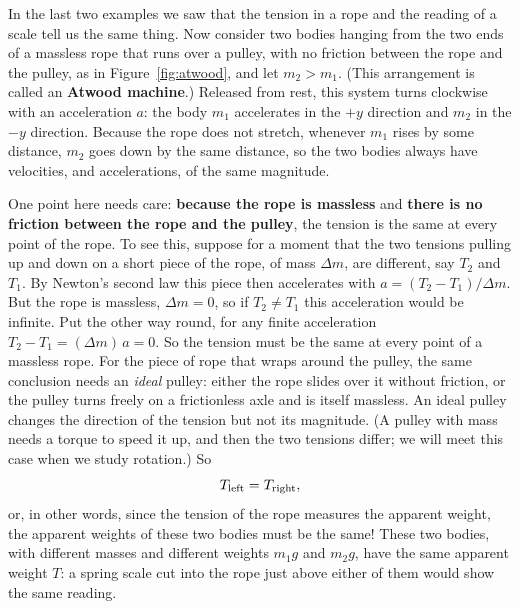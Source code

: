 \documentclass[11pt,a4paper]{article}
\begin{document}
In the last two examples we saw that the tension in a rope and the reading of a scale tell us the
same thing. Now consider two bodies hanging from the two ends of a massless rope that runs over a
pulley, with no friction between the rope and the pulley, as in Figure~\ref{fig:atwood}, and let
$m_2 > m_1$. (This arrangement is called an \textbf{Atwood machine}.) Released from rest, this system
turns clockwise with an acceleration $a$: the body $m_1$ accelerates in the $+y$ direction and $m_2$
in the $-y$ direction. Because the rope does not stretch, whenever $m_1$ rises by some distance,
$m_2$ goes down by the same distance, so the two bodies always have velocities, and accelerations,
of the same magnitude.

One point here needs care: \textbf{because the rope is massless} and \textbf{there is no friction
between the rope and the pulley}, the tension is the same at every point of the rope. To see this,
suppose for a moment that the two tensions pulling up and down on a short piece of the rope, of mass
$\Delta m$, are different, say $T_2$ and $T_1$. By Newton's second law this piece then accelerates
with $a = (T_2 - T_1)/\Delta m$. But the rope is massless, $\Delta m = 0$, so if $T_2 \neq T_1$ this
acceleration would be infinite. Put the other way round, for any finite acceleration
$T_2 - T_1 = (\Delta m)\,a = 0$. So the tension must be the same at every point of a massless rope.
For the piece of rope that wraps around the pulley, the same conclusion needs an \emph{ideal}
pulley: either the rope slides over it without friction, or the pulley turns freely on a
frictionless axle and is itself massless. An ideal pulley changes the direction of the tension but
not its magnitude. (A pulley with mass needs a torque to speed it up, and then the two tensions
differ; we will meet this case when we study rotation.) So
\begin{equation}\label{eq:T-equal}
  T_{\mathrm{left}} = T_{\mathrm{right}} ,
\end{equation}
or, in other words, since the tension of the rope measures the apparent weight, the apparent
weights of these two bodies must be the same! These two bodies, with different masses and different
weights $m_1 g$ and $m_2 g$, have the same apparent weight $T$: a spring scale cut into the rope just
above either of them would show the same reading.
\end{document}
